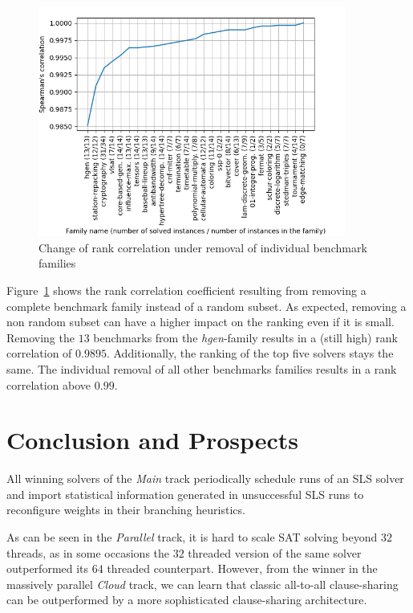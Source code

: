 \documentclass{elsarticle}
\begin{document}
\begin{figure}[h]
  \label{fig:sampleFamily}
  \centering
  \includegraphics[width=0.9\textwidth]{stability/fam_leave_one_out_corr.png}
  \caption{Change of rank correlation under removal of individual benchmark families}
\end{figure}

Figure~\ref{fig:sampleFamily} shows the rank
correlation coefficient resulting from removing a complete benchmark family
instead of a random subset. As expected, removing a non random subset can have a
higher impact on the ranking even if it is small. Removing the $13$ benchmarks
from the \emph{hgen}-family results in a (still high) rank correlation of
$0.9895$. Additionally, the ranking of the top five solvers stays the same.
The individual removal of all other benchmarks families results in a rank correlation above $0.99$.

\section{Conclusion and Prospects}
\label{sec:conclusion}

All winning solvers of the \emph{Main} track periodically schedule runs of an SLS solver and import statistical information generated in unsuccessful SLS runs to reconfigure weights in their branching heuristics. 

As can be seen in the \emph{Parallel} track, it is hard to scale SAT solving beyond $32$ threads, as in some occasions the $32$ threaded version of the same solver outperformed its $64$ threaded counterpart. 
However, from the winner in the massively parallel \emph{Cloud} track, we can learn that classic all-to-all clause-sharing can be outperformed by a more sophisticated clause-sharing architecture. 
\end{document}
